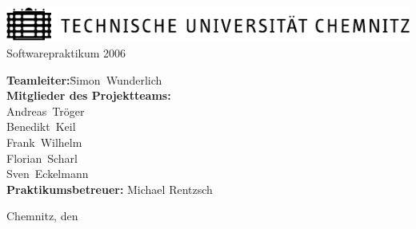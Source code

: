 
\begin{titlepage}
	\begin{center}\sffamily
		\vspace{15mm}
		\includegraphics{tuclogo}
		\vfill
		{%
			\large Softwarepraktikum 2006\\[1.5ex]
		}
		\vfill \vfill

		\textbf{\Huge\dctitle}
		\vspace{1.5cm}
		
		\textbf{\Large\dcsubject}

		\textsc{\Large \dcsubtitle}
		\vfill \vfill
	\end{center}
	
	
	{%
		\begin{tabbing}
			\hspace{4.5cm}\=\textbf{Teamleiter:}\hspace{0.5cm}\=Simon~Wunderlich\\[2.0ex]
				\>\textbf{Mitglieder des Projektteams:}\\[1.5ex]
				\>            \>Andreas~Tröger \\[1.5ex]
				\>            \>Benedikt~Keil \\[1.5ex]
				\>            \>Frank~Wilhelm \\[1.5ex]
				\>            \>Florian~Scharl \\[1.5ex]
				\>            \>Sven~Eckelmann \\[4.0ex]
				\> \textbf{Praktikumsbetreuer:} Michael Rentzsch
		\end{tabbing}
	}
	\vfill
	
	{%
		Chemnitz, den \dcdate
	}
\end{titlepage}
